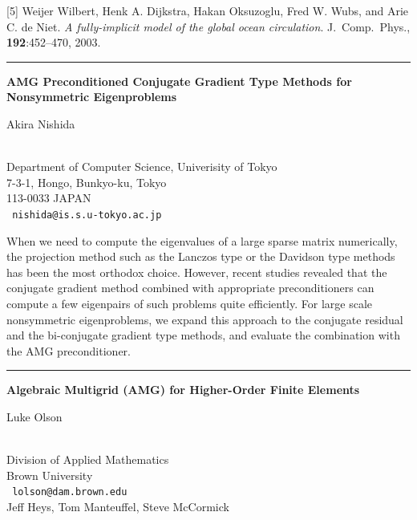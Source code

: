 \documentclass[twosided]{report}
\begin{document}
[5]
Weijer Wilbert, Henk A.  Dijkstra, Hakan Oksuzoglu, Fred W.  Wubs, and
Arie C. de Niet.
{\em A fully-implicit model of the global ocean circulation}.
J.~Comp.~Phys., {\bf 192}:452--470, 2003.


\begin{center} \rule{6in}{1pt} \end{center}


\begin{center}
{\large			\label{nishida}
{\bf
AMG Preconditioned Conjugate Gradient Type Methods
for Nonsymmetric Eigenproblems
}

Akira Nishida} \\
Department of Computer Science, Univerisity of Tokyo \\
7-3-1, Hongo, Bunkyo-ku, Tokyo \\
113-0033 JAPAN
\\ {\tt
nishida@is.s.u-tokyo.ac.jp
}
\end{center}


When we need to compute the eigenvalues of a large sparse matrix
numerically, the projection method such as the Lanczos type or the
Davidson type methods has been the most orthodox choice. However,
recent studies revealed that the conjugate gradient method combined
with appropriate preconditioners can compute a few eigenpairs of such
problems quite efficiently. For large scale nonsymmetric eigenproblems,
we expand this approach to the conjugate residual and the bi-conjugate
gradient type methods, and evaluate the combination with the AMG
preconditioner.


\begin{center} \rule{6in}{1pt} \end{center}
\newpage	%


\begin{center}
{\large			\label{olson}
{\bf
Algebraic Multigrid (AMG) for Higher-Order Finite Elements
}

Luke Olson} \\
Division of Applied Mathematics \\
Brown University
\\ {\tt
lolson@dam.brown.edu
}
\\
Jeff Heys,
Tom Manteuffel,
Steve McCormick
\end{center}
\end{document}
